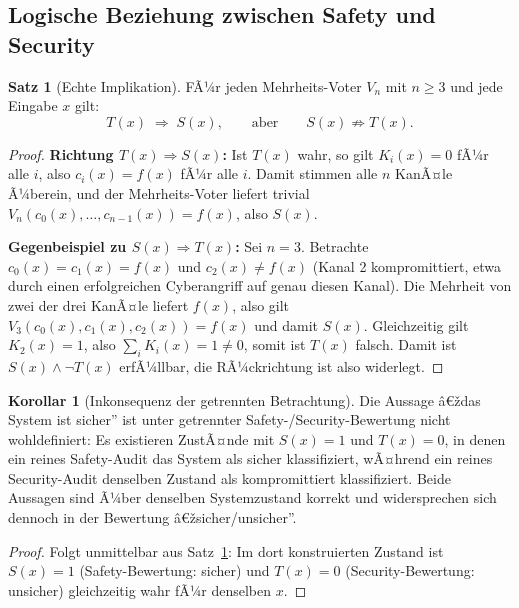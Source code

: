 ﻿\documentclass[a4paper,12pt]{article}
\theoremstyle{definition}
\newtheorem{satz}{Satz}
\newtheorem{korollar}{Korollar}
\begin{document}
\subsection{Logische Beziehung zwischen Safety und Security}

\begin{satz}[Echte Implikation]
	\label{satz:implikation}
	FÃ¼r jeden Mehrheits-Voter $V_n$ mit $n \geq 3$ und jede Eingabe $x$ gilt:
	\[
	T(x) \;\Rightarrow\; S(x), \qquad \text{aber} \qquad S(x) \not\Rightarrow T(x).
	\]
\end{satz}

\begin{proof}
	\textbf{Richtung $T(x) \Rightarrow S(x)$:} Ist $T(x)$ wahr, so gilt $K_i(x) = 0$ fÃ¼r alle $i$, also $c_i(x) = f(x)$ fÃ¼r alle $i$. Damit stimmen alle $n$ KanÃ¤le Ã¼berein, und der Mehrheits-Voter liefert trivial $V_n(c_0(x),\ldots,c_{n-1}(x)) = f(x)$, also $S(x)$.

	\textbf{Gegenbeispiel zu $S(x) \Rightarrow T(x)$:} Sei $n = 3$. Betrachte $c_0(x) = c_1(x) = f(x)$ und $c_2(x) \neq f(x)$ (Kanal 2 kompromittiert, etwa durch einen erfolgreichen Cyberangriff auf genau diesen Kanal). Die Mehrheit von zwei der drei KanÃ¤le liefert $f(x)$, also gilt $V_3(c_0(x),c_1(x),c_2(x)) = f(x)$ und damit $S(x)$. Gleichzeitig gilt $K_2(x) = 1$, also $\sum_i K_i(x) = 1 \neq 0$, somit ist $T(x)$ falsch. Damit ist $S(x) \wedge \neg T(x)$ erfÃ¼llbar, die RÃ¼ckrichtung ist also widerlegt. \qedhere
\end{proof}

\begin{korollar}[Inkonsequenz der getrennten Betrachtung]
	\label{kor:inkonsequenz}
	Die Aussage â€ždas System ist sicher'' ist unter getrennter Safety-/Security-Bewertung nicht wohldefiniert: Es existieren ZustÃ¤nde mit $S(x) = 1$ und $T(x) = 0$, in denen ein reines Safety-Audit das System als sicher klassifiziert, wÃ¤hrend ein reines Security-Audit denselben Zustand als kompromittiert klassifiziert. Beide Aussagen sind Ã¼ber denselben Systemzustand korrekt und widersprechen sich dennoch in der Bewertung â€žsicher/unsicher''.
\end{korollar}

\begin{proof}
	Folgt unmittelbar aus Satz~\ref{satz:implikation}: Im dort konstruierten Zustand ist $S(x)=1$ (Safety-Bewertung: sicher) und $T(x)=0$ (Security-Bewertung: unsicher) gleichzeitig wahr fÃ¼r denselben $x$. \qedhere
\end{proof}
\end{document}
